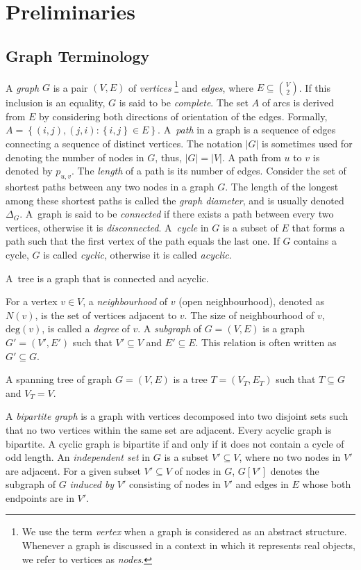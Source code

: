 \chapter{Preliminaries}\label{sec:back}

\section{Graph Terminology}\label{sec:back:graph}

A \emph{graph} $G$ is a pair $(V,E)$ of \emph{vertices}
\footnote{We use the term \emph{vertex} when a graph is considered as an abstract structure. 
Whenever a graph is discussed in a context in which it represents real objects, we refer to vertices as \emph{nodes}. 
}
and \emph{edges}, where $E\subseteq {{V}\choose{2}}$.
If this inclusion is an equality, $G$ is said to be \emph{complete}.
 The set $A$ of arcs is derived from $E$ by considering both directions of orientation of the edges.
 Formally, $A=\left\{(i,j),(j,i):\left\{i,j\right\}\in E\right\}$.
A~\emph{path} in a graph is a sequence of edges connecting a sequence of distinct vertices.
The notation $|G|$ is sometimes used for denoting the number of nodes in $G$, thus, $|G|=|V|$. 
A path from $u$ to $v$ is denoted by $p_{u,v}$.
The \emph{length} of a path is its number of edges.
Consider the set of shortest paths between any two nodes in a graph $G$.
The length of the longest among these shortest paths is called the \emph{graph diameter}, and is usually denoted $\Delta_G$.
A~graph is said to be \emph{connected} if there exists a path between every two vertices, otherwise it is \emph{disconnected}.
A~\emph{cycle} in $G$ is a subset of $E$ that forms a path such that the first vertex of the path equals the last one. 
If $G$ contains a cycle, $G$ is called \emph{cyclic}, otherwise it is called \emph{acyclic}.
\begin{definition}
A~tree is a graph that is connected and acyclic.
\end{definition}
For a vertex $v\in V$, a \emph{neighbourhood} of $v$ (open neighbourhood), denoted as $N(v)$, is the set of vertices adjacent to $v$.
The size of neighbourhood of $v$, $\text{deg}(v)$, is called a \emph{degree} of $v$.
A \emph{subgraph} of $G=(V,E)$ is a graph $G'=(V',E')$ such that $V'\subseteq V$ and $E'\subseteq E$.
This relation is often written as $G'\subseteq G$.
\begin{definition}
A spanning tree of graph $G=(V,E)$ is a tree $T=(V_T,E_T)$ such that $T\subseteq G$ and $V_T=V$.
\end{definition}
A \emph{bipartite graph} is a graph with vertices decomposed into two disjoint sets such that no two vertices within the same set are adjacent.
Every acyclic graph is bipartite.
A cyclic graph is bipartite if and only if it does not contain a cycle of odd length.
An \emph{independent set} in $G$ is a subset $V'\subseteq V$, where no two nodes in $V'$ are adjacent.
For a given subset $V'\subseteq V$ of nodes in $G$, $G\left[V'\right]$ denotes the subgraph of $G$ \emph{induced by} $V'$ consisting of nodes in $V'$ and edges in $E$ whose both endpoints are in $V'$.

